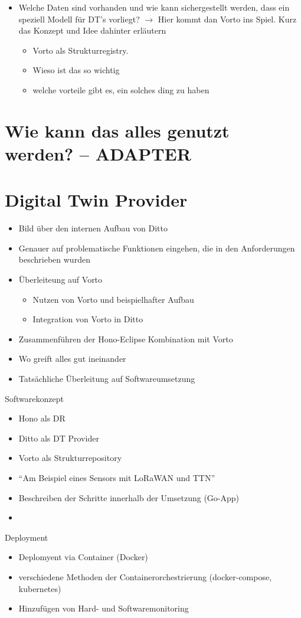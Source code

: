 \begin{enumerate}
\begin{itemize}
\begin{itemize}
        \end{itemize}
        \item Welche Daten sind vorhanden und wie kann sichergestellt werden, dass ein speziell Modell für DT's vorliegt? $\rightarrow$ Hier kommt dan Vorto ins Spiel. Kurz das Konzept und Idee dahinter erläutern
        \begin{itemize}
            \item Vorto als Strukturregistry.
            \item Wieso ist das so wichtig
            \item welche vorteile gibt es, ein solches ding zu haben
        \end{itemize}
    \end{itemize}
\end{enumerate}

\section{Wie kann das alles genutzt werden? -- ADAPTER}

\section{Digital Twin Provider}

\begin{itemize}
    \item Bild über den internen Aufbau von Ditto
    \item Genauer auf problematische Funktionen eingehen, die in den Anforderungen beschrieben wurden
    \item Überleiteung auf Vorto
    \begin{itemize}
        \item Nutzen von Vorto und beispielhafter Aufbau
        \item Integration von Vorto in Ditto
    \end{itemize}
    \item Zusammenführen der Hono-Eclipse Kombination mit Vorto
    \item Wo greift alles gut ineinander
    \item Tatsächliche Überleitung auf Softwareumsetzung
\end{itemize}

\large{Softwarekonzept}
\normalsize
\begin{itemize}
    \item Hono als DR
    \item Ditto als DT Provider
    \item Vorto als Strukturrepository
    \item \enquote{Am Beispiel eines Sensors mit LoRaWAN und TTN}
    \item Beschreiben der Schritte innerhalb der Umsetzung (Go-App)
    \item 
\end{itemize}

\large{Deployment}
\normalsize
\begin{itemize}
    \item Deplomyent via Container (Docker)
    \item verschiedene Methoden der Containerorchestrierung (docker-compose, kubernetes)
    \item Hinzufügen von Hard- und Softwaremonitoring
\end{itemize}
